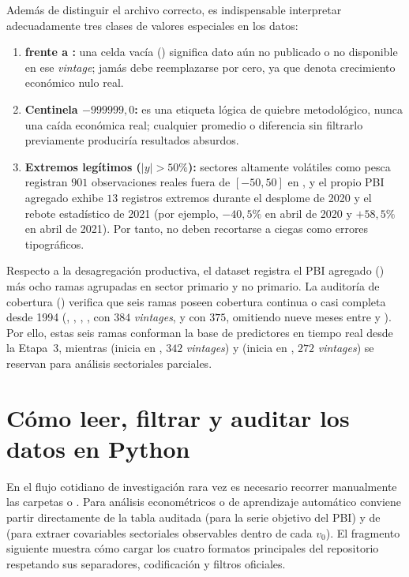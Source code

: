 \documentclass[12pt,letterpaper]{article}
\begin{document}
Además de distinguir el archivo correcto, es indispensable interpretar adecuadamente tres clases de valores especiales en los datos:
\begin{enumerate}
  \item \textbf{ frente a :} una celda vacía () significa dato aún no publicado o no disponible en ese \emph{vintage}; jamás debe reemplazarse por cero, ya que  denota crecimiento económico nulo real.
  \item \textbf{Centinela \(-999999{,}0\):} es una etiqueta lógica de quiebre metodológico, nunca una caída económica real; cualquier promedio o diferencia sin filtrarlo previamente produciría resultados absurdos.
  \item \textbf{Extremos legítimos (\(\lvert y \rvert > 50\%\)):} sectores altamente volátiles como pesca registran \(901\) observaciones reales fuera de \([-50, 50]\) en , y el propio PBI agregado exhibe \(13\) registros extremos durante el desplome de 2020 y el rebote estadístico de 2021 (por ejemplo, \(-40{,}5\%\) en abril de 2020 y \(+58{,}5\%\) en abril de 2021). Por tanto, no deben recortarse a ciegas como errores tipográficos.
\end{enumerate}

Respecto a la desagregación productiva, el dataset registra el PBI agregado () más ocho ramas agrupadas en sector primario y no primario. La auditoría de cobertura () verifica que seis ramas poseen cobertura continua o casi completa desde 1994 (, , , ,  con \(384\) \emph{vintages}, y  con \(375\), omitiendo nueve meses entre  y ). Por ello, estas seis ramas conforman la base de predictores en tiempo real desde la Etapa~3, mientras  (inicia en , \(342\) \emph{vintages}) y  (inicia en , \(272\) \emph{vintages}) se reservan para análisis sectoriales parciales.

\section{Cómo leer, filtrar y auditar los datos en Python}

En el flujo cotidiano de investigación rara vez es necesario recorrer manualmente las carpetas  o . Para análisis econométricos o de aprendizaje automático conviene partir directamente de la tabla auditada  (para la serie objetivo del PBI) y de  (para extraer covariables sectoriales observables dentro de cada \(v_0\)). El fragmento siguiente muestra cómo cargar los cuatro formatos principales del repositorio respetando sus separadores, codificación y filtros oficiales.
\end{document}
